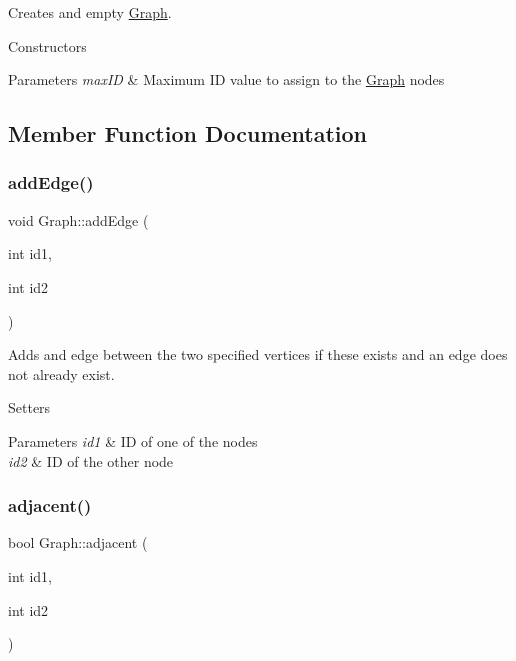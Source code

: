 Creates and empty \hyperlink{classGraph}{Graph}. 

Constructors 
\begin{DoxyParams}{Parameters}
{\em max\+ID} & Maximum ID value to assign to the \hyperlink{classGraph}{Graph} nodes \\
\hline
\end{DoxyParams}


\subsection{Member Function Documentation}
\mbox{\label{classGraph_acbe5b7cf2a17849a3c8385890c556625}} 
\subsubsection{\texorpdfstring{add\+Edge()}{addEdge()}}
{\footnotesize\ttfamily void Graph\+::add\+Edge (\begin{DoxyParamCaption}\item[{int}]{id1,  }\item[{int}]{id2 }\end{DoxyParamCaption})}



Adds and edge between the two specified vertices if these exists and an edge does not already exist. 

Setters 
\begin{DoxyParams}{Parameters}
{\em id1} & ID of one of the nodes \\
\hline
{\em id2} & ID of the other node \\
\hline
\end{DoxyParams}
\mbox{\label{classGraph_a6d50028c1549bf475a3042709c013174}} 
\subsubsection{\texorpdfstring{adjacent()}{adjacent()}}
{\footnotesize\ttfamily bool Graph\+::adjacent (\begin{DoxyParamCaption}\item[{int}]{id1,  }\item[{int}]{id2 }\end{DoxyParamCaption})}



